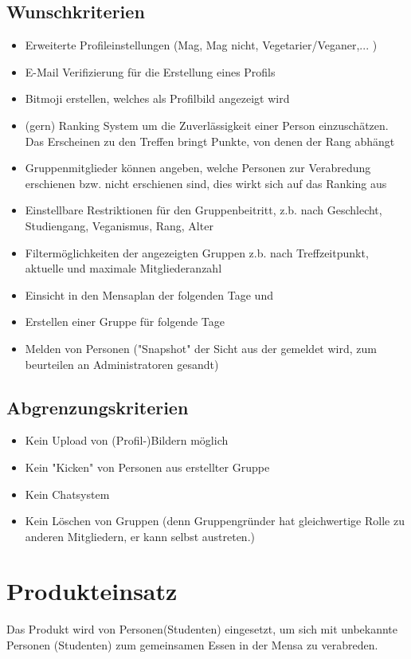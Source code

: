 \documentclass[a4paper]{scrreprt}
\begin{document}
\section{Wunschkriterien}
\begin{itemize}

\item Erweiterte Profileinstellungen (Mag, Mag nicht, Vegetarier/Veganer,... )
\item E-Mail Verifizierung für die Erstellung eines Profils 
\item Bitmoji erstellen, welches als Profilbild angezeigt wird
\item (gern) Ranking System um die Zuverlässigkeit einer Person einzuschätzen. Das Erscheinen zu den Treffen bringt Punkte, von denen der Rang abhängt
\item Gruppenmitglieder können angeben, welche Personen zur Verabredung erschienen bzw. nicht erschienen sind, dies wirkt sich auf das Ranking aus
\item Einstellbare Restriktionen für den Gruppenbeitritt, z.b. nach Geschlecht, Studiengang, Veganismus, Rang, Alter
\item Filtermöglichkeiten der angezeigten Gruppen z.b. nach Treffzeitpunkt, aktuelle und maximale Mitgliederanzahl 
\item Einsicht in den Mensaplan der folgenden Tage und
\item Erstellen einer Gruppe für folgende Tage
\item Melden von Personen ("Snapshot" der Sicht aus der gemeldet wird, zum beurteilen an Administratoren gesandt) 
\end{itemize}
 
\section{Abgrenzungskriterien}
\begin{itemize}

\item Kein Upload von (Profil-)Bildern möglich
\item Kein "Kicken" von Personen aus erstellter Gruppe
\item Kein Chatsystem
\item Kein Löschen von Gruppen (denn Gruppengründer hat gleichwertige Rolle zu anderen Mitgliedern, er kann selbst austreten.)

\end{itemize}
 
\chapter{Produkteinsatz}
Das Produkt wird von Personen(Studenten) eingesetzt, um sich mit unbekannte Personen (Studenten) zum gemeinsamen Essen in der Mensa zu verabreden.
\end{document}
